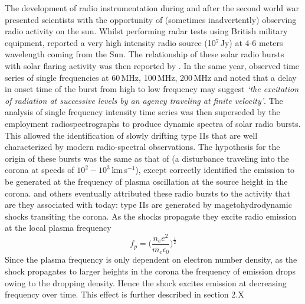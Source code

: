 The development of radio instrumentation during and after the second world war presented scientists with the opportunity of (sometimes inadvertently) observing radio activity on the sun. Whilst performing radar tests using British military equipment, \citep{hey1946} reported a very high intensity radio source (10$^{7}$\,Jy) at 4-6 meters wavelength coming from the Sun. The relationship of these solar radio bursts with solar flaring activity was then reported by \citep{allen1947}. In the same year, \citet{payne1947} observed time series of single frequencies at 60\,MHz, 100\,MHz, 200\,MHz and noted that a delay in onset time of the burst from high to low frequency may suggest {\it \textquoteleft the excitation of radiation at successive levels by an agency traveling at finite velocity'}. %
The analysis of single frequency intensity time series was then superseded by the employment radiospectrographs to produce dynamic spectra of solar radio bursts. This allowed the identification of slowly drifting type IIs that are well characterized by modern radio-spectral observations. The hypothesis for the origin of these bursts was the same as that of \citet{payne1947} (a disturbance traveling into the corona at speeds of $10^{2}-10^{3}$\,km\,s$^{-1}$), except \citet{wild1954} correctly identified the emission to be generated at the frequency of plasma oscillation at the source height in the corona. \citep{uchida1960} and others eventually attributed these radio bursts to the activity that are they associated with today: type IIs are generated by magetohydrodynamic shocks transiting the corona. As the shocks propagate they excite radio emission at the local plasma frequency
\begin{equation}
f_p = \bigg( \frac{n_e e^2}{m_e \epsilon_0} \bigg)^\frac{1}{2}
\end{equation}
Since the plasma frequency is only dependent on electron number density, as the shock propagates to larger heights in the corona the frequency of emission drops owing to the dropping density. Hence the shock excites emission at decreasing frequency over time. This effect is further described in section 2.X


